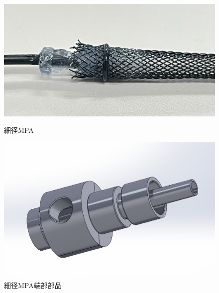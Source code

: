 \documentclass{jarticle}
\begin{document}
\begin{figure}[t]
  \begin{minipage}[b]{0.47\columnwidth}
    \centering
    \includegraphics[scale=0.044]{mpa_oring_1.jpg}
    \vspace{-6.5mm}
    \caption{細径MPA}
    \label{fig:OringMPA}
  \end{minipage}
  \hspace{0.04\columnwidth}
  \begin{minipage}[b]{0.47\columnwidth}
    \centering
    \includegraphics[scale=0.12]{MPAparts.JPG}
    \vspace{-4.5mm}
    \caption{細径MPA端部部品}
    \label{fig:MPAparts}
  \end{minipage}
\end{figure}
\end{document}
